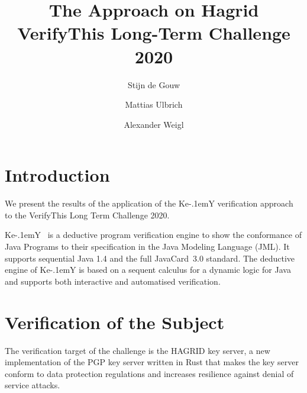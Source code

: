 \documentclass{llncs}
\title{The \KeY Approach on Hagrid
  \\{\small VerifyThis Long-Term Challenge 2020 }}
\author{ Stijn de Gouw \and Mattias Ulbrich \and Alexander Weigl }
\institute{Open University \and Karlsruhe Institute of Technology}
\newcommand{\KeY}{Ke\kern-.1emY\xspace}
\begin{document}
\maketitle

\section{Introduction}

We present the results of the application of the \KeY verification
approach to the VerifyThis Long Term Challenge 2020. 



\KeY~\cite{KeYBook2} is a deductive program verification engine to
show the conformance of Java Programs to their specification in the
Java Modeling Language (JML). It supports sequential Java 1.4 and the
full JavaCard~3.0 standard.
%
The deductive engine of \KeY is based on a sequent calculus for a
dynamic logic for Java and supports both interactive and automatised
verification.


\section{Verification of the Subject}
The verification target of the challenge is the HAGRID key server, a
new implementation of the PGP key server written in Rust that makes
the key server conform to data protection regulations and increases
resilience against denial of service attacks.
\end{document}
